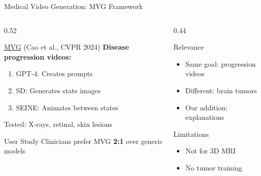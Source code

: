\documentclass[aspectratio=169,xcolor=dvipsnames]{beamer}
\begin{document}
\begin{frame}{Medical Video Generation: MVG Framework}
    \begin{columns}
        \begin{column}{0.52\textwidth}
            \begin{block}{\href{https://openaccess.thecvf.com/content/CVPR2024/html/Cao_MVG_CVPR_2024_paper.html}{MVG} (Cao et al., CVPR 2024)}
                \small
                \textbf{Disease progression videos:}
                \begin{enumerate}\setlength{\itemsep}{1pt}
                    \item GPT-4: Creates prompts
                    \item SD: Generates state images
                    \item SEINE: Animates between states
                \end{enumerate}
                
                Tested: X-rays, retinal, skin lesions
            \end{block}
            
            \begin{exampleblock}{User Study}
                \small Clinicians prefer MVG \textbf{2:1} over generic models
            \end{exampleblock}
        \end{column}
        
        \begin{column}{0.44\textwidth}
            \begin{block}{Relevance}
                \small
                \begin{itemize}\setlength{\itemsep}{1pt}
                    \item Same goal: progression videos
                    \item Different: brain tumors
                    \item Our addition: explanations
                \end{itemize}
            \end{block}
            
            \begin{block}{Limitations}
                \small
                \begin{itemize}\setlength{\itemsep}{1pt}
                    \item Not for 3D MRI
                    \item No tumor training
                \end{itemize}
            \end{block}
            

\end{column}
\end{columns}
\end{frame}
\end{document}
